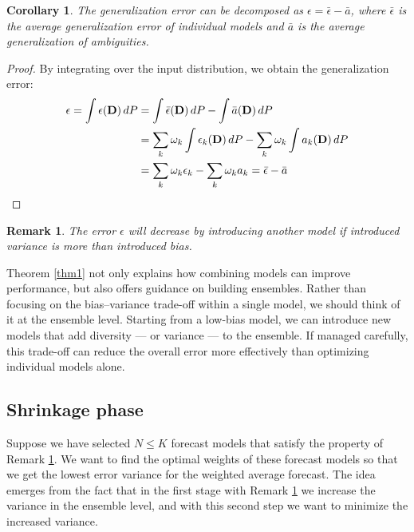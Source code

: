 \documentclass{article}
\newtheorem{remark}{Remark}
\newtheorem{corollary}{Corollary}
\begin{document}
\begin{corollary}\label{crl1}
The generalization error can be decomposed as $\epsilon = \bar{\epsilon} - \bar{a}$, where $\bar{\epsilon}$ is the average generalization error of individual models and $\bar{a}$ is the average generalization of ambiguities. 
\end{corollary}

\begin{proof}
By integrating over the input distribution, we obtain the generalization error:
\begin{equation}
\begin{aligned}
\epsilon = \int \epsilon(\textbf{D}) \, dP &= \int \bar{\epsilon}(\textbf{D}) \, dP - \int \bar{a}(\textbf{D}) \, dP \\
&\hspace{-0em} = \sum_k \omega_k \int \epsilon_k(\textbf{D}) \, dP - \sum_k \omega_k \int a_k(\textbf{D}) \, dP \\
&= \sum_k \omega_k \epsilon_k - \sum_k \omega_k a_k = \bar{\epsilon} - \bar{a}
\end{aligned}
\end{equation}
\end{proof} 

\begin{remark} \label{rmk1}
     The error $\epsilon$ will decrease by introducing another model if introduced variance is more than introduced bias. 
\end{remark} 

Theorem \ref{thm1} not only explains how combining models can improve performance, but also offers guidance on building ensembles. Rather than focusing on the bias–variance trade-off within a single model, we should think of it at the ensemble level. Starting from a low-bias model, we can introduce new models that add diversity — or variance — to the ensemble. If managed carefully, this trade-off can reduce the overall error more effectively than optimizing individual models alone.

\subsection{Shrinkage phase}
Suppose we have selected $N \leq K$ forecast models that satisfy the property of Remark \ref{rmk1}. We want to find the optimal weights of these forecast models so that we get the lowest error variance for the weighted average forecast. The idea emerges from the fact that in the first stage with Remark \ref{rmk1} we increase the variance in the ensemble level, and with this second step we want to minimize the increased variance.  
\end{document}
